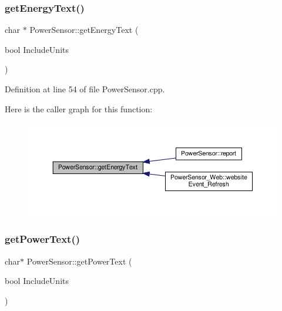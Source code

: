 \mbox{\label{class_power_sensor_a20b1412111d88dbf9ec19b1716dadb11}} 
\subsubsection{\texorpdfstring{get\+Energy\+Text()}{getEnergyText()}\hspace{0.1cm}{\footnotesize\ttfamily [2/2]}}
{\footnotesize\ttfamily char $\ast$ Power\+Sensor\+::get\+Energy\+Text (\begin{DoxyParamCaption}\item[{bool}]{Include\+Units }\end{DoxyParamCaption})}



Definition at line 54 of file Power\+Sensor.\+cpp.

Here is the caller graph for this function\+:
\nopagebreak
\begin{figure}[H]
\begin{center}
\leavevmode
\includegraphics[width=350pt]{class_power_sensor_a20b1412111d88dbf9ec19b1716dadb11_icgraph}
\end{center}
\end{figure}
\mbox{\label{class_power_sensor_ae7d0b6b4b823cea31b7958cae583ed69}} 
\subsubsection{\texorpdfstring{get\+Power\+Text()}{getPowerText()}\hspace{0.1cm}{\footnotesize\ttfamily [1/2]}}
{\footnotesize\ttfamily char$\ast$ Power\+Sensor\+::get\+Power\+Text (\begin{DoxyParamCaption}\item[{bool}]{Include\+Units }\end{DoxyParamCaption})}

